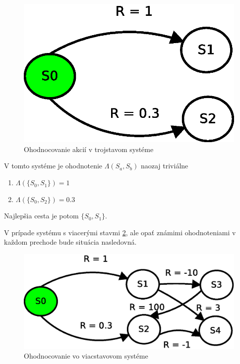\begin{figure}[!htb]
\centering
\includegraphics[scale=.6]{../diagrams/rf_two_states.eps}
\caption{Ohodnocovanie akcií v trojstavom systéme}
\label{img:three_states_system}
\end{figure}

V tomto systéme je ohodnotenie $\Lambda(S_a, S_b)$ naozaj triviálne

\begin{enumerate}
  \item $\Lambda(\{S_0, S_1\}) = 1$
  \item $\Lambda(\{S_0, S_2\}) = 0.3$
\end{enumerate}

Najlepšia cesta je potom $\{S_0, S_1\}$.

V prípade systému s viacerými stavmi \ref{img:multiple_states_system}, ale
opať známimi ohodnoteniami v každom prechode bude situácia nasledovná.

\begin{figure}[!htb]
\centering
\includegraphics[scale=.6]{../diagrams/rf_more_states.eps}
\caption{Ohodnocovanie vo viacstavovom systéme}
\label{img:multiple_states_system}
\end{figure}

